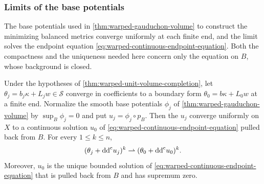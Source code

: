 \subsubsection{Limits of the base potentials}
\label{sec:warped-endpoint-potential-limits}

The base potentials used in \cref{thm:warped-gauduchon-volume} to construct the minimizing balanced metrics converge uniformly at each finite end, and the limit solves the endpoint equation \eqref{eq:warped-continuous-endpoint-equation}. Both the compactness and the uniqueness needed here concern only the equation on $B$, whose background is closed.

\begin{proposition}\label{prop:warped-endpoint-potential-limits}
Under the hypotheses of \cref{thm:warped-unit-volume-completion}, let $\theta_j=b_j\kappa+L_jw\in\mathscr S$ converge in coefficients to a boundary form $\theta_0=b\kappa+L_0w$ at a finite end. Normalize the smooth base potentials $\phi_j$ of \cref{thm:warped-gauduchon-volume} by $\sup_B\phi_j=0$ and put $u_j=\phi_j\circ p_B$. Then the $u_j$ converge uniformly on $X$ to a continuous solution $u_0$ of \eqref{eq:warped-continuous-endpoint-equation} pulled back from $B$. For every $1\leq k\leq n$,
\[
 (\theta_j+\mathrm{dd}^{\mathrm{c}} u_j)^k\rightharpoonup
             (\theta_0+\mathrm{dd}^{\mathrm{c}} u_0)^k.
\]
Moreover, $u_0$ is the unique bounded solution of \eqref{eq:warped-continuous-endpoint-equation} that is pulled back from $B$ and has supremum zero.
\end{proposition}
